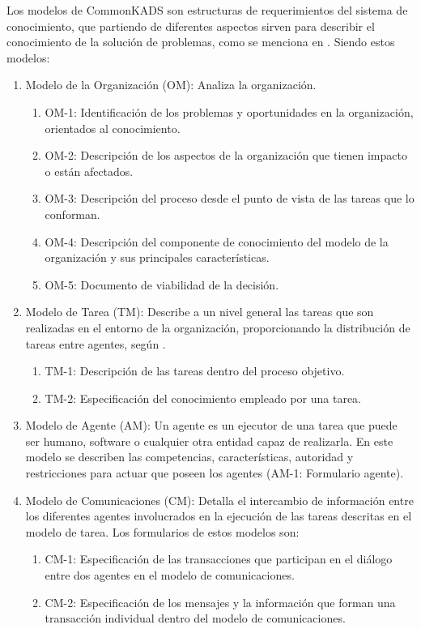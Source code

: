 Los modelos de CommonKADS son estructuras de requerimientos del sistema de conocimiento, que partiendo de diferentes aspectos sirven para describir el conocimiento de la solución de problemas, como se menciona en \citealt[pg. 36]{Henao}. Siendo estos modelos:

\begin{enumerate}
\item Modelo de la Organización (OM): Analiza la organización.
  \begin{enumerate}
  \item OM-1: Identificación de los problemas y oportunidades en la organización, orientados al conocimiento.
  \item OM-2: Descripción de los aspectos de la organización que tienen impacto o están afectados.
  \item OM-3: Descripción del proceso desde el punto de vista de las tareas que lo conforman.
  \item OM-4: Descripción del componente de conocimiento del modelo de la organización y sus principales características.
  \item OM-5: Documento de viabilidad de la decisión.
  \end{enumerate}

\item Modelo de Tarea (TM): Describe a un nivel general las tareas que son realizadas en el entorno de la organización, proporcionando la distribución de tareas entre agentes, según \citealt[pg. 39]{Henao}.
  \begin{enumerate}
  \item TM-1: Descripción de las tareas dentro del proceso objetivo.
  \item TM-2: Especificación del conocimiento empleado por una tarea.
  \end{enumerate}

\item Modelo de Agente (AM): Un agente es un ejecutor de una tarea que puede ser humano, software o cualquier otra entidad capaz de realizarla. En este modelo se describen las competencias, características, autoridad y restricciones para actuar que poseen los agentes (AM-1: Formulario agente).

\item Modelo de Comunicaciones (CM): Detalla el intercambio de información entre los diferentes agentes involucrados en la ejecución de las tareas descritas en el modelo de tarea. Los formularios de estos modelos son:
  \begin{enumerate}
  \item CM-1: Especificación de las transacciones que participan en el diálogo entre dos agentes en el modelo de comunicaciones.
  \item CM-2: Especificación de los mensajes y la información que forman una transacción individual dentro del modelo de comunicaciones.
  \end{enumerate}


\end{enumerate}
